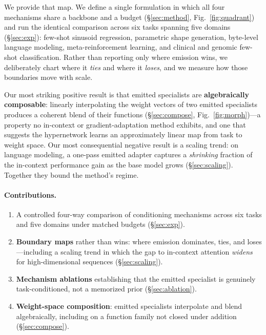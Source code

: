 \documentclass[11pt]{article}
\begin{document}
We provide that map. We define a single formulation in which all four mechanisms
share a backbone and a budget (\S\ref{sec:method}, Fig.~\ref{fig:quadrant}) and run
the identical comparison across six tasks spanning five domains
(\S\ref{sec:exp}): few-shot sinusoid regression, parametric shape generation,
byte-level language modeling, meta-reinforcement learning, and clinical and genomic
few-shot classification. Rather than reporting only where emission wins, we
deliberately chart where it \emph{ties} and where it \emph{loses}, and we measure how
those boundaries move with scale.

Our most striking positive result is that emitted specialists are
\textbf{algebraically composable}: linearly interpolating the weight vectors of two
emitted specialists produces a coherent blend of their functions
(\S\ref{sec:compose}, Fig.~\ref{fig:morph})---a property no in-context or
gradient-adaptation method exhibits, and one that suggests the hypernetwork learns an
approximately linear map from task to weight space. Our most consequential negative
result is a scaling trend: on language modeling, a one-pass emitted adapter captures
a \emph{shrinking} fraction of the in-context performance gain as the base model
grows (\S\ref{sec:scaling}). Together they bound the method's regime.

\paragraph{Contributions.}
\begin{enumerate}[label=(C\arabic*),leftmargin=2.6em,topsep=2pt]
  \item A controlled four-way comparison of conditioning mechanisms across six tasks
        and five domains under matched budgets (\S\ref{sec:exp}).
  \item \textbf{Boundary maps} rather than wins: where emission dominates, ties, and
        loses---including a scaling trend in which the gap to in-context attention
        \emph{widens} for high-dimensional sequences (\S\ref{sec:scaling}).
  \item \textbf{Mechanism ablations} establishing that the emitted specialist is
        genuinely task-conditioned, not a memorized prior (\S\ref{sec:ablation}).
  \item \textbf{Weight-space composition}: emitted specialists interpolate and blend
        algebraically, including on a function family not closed under addition
        (\S\ref{sec:compose}).
\end{enumerate}
\end{document}
